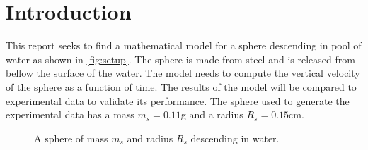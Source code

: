 \documentclass[10pt,a4paper, twocolumn]{article}
\title{\theTitle}
\author{\theAuthors}
\date{\today}
\begin{document}
	
	
	\maketitle
	\thispagestyle{empty}
	
	
	\begin{abstract}
		This report considers modelling the velocity of sphere falling through water. A simple model using Stokes' law is presented then compared to experimental data. The Reynolds number is then computed to show this problem falls outside the valid domain of Stokes' law. An improved model of drag is proposed using a drag coefficient. This model is also compared to the experimental data and gives good agreement with the terminal velocity reached. Possible further improvements such as the addition of a virtual weight and the inclusion a Basset force are discussed. 
		
	\end{abstract}
	
	
	\section{Introduction}
	\label{sec:intro}
	
	This report seeks to find a mathematical model for a sphere descending in pool of water as shown in \autoref{fig:setup}. The sphere is made from steel and is released from bellow the surface of the water. The model needs to compute the vertical velocity of the sphere as a function of time. The results of the model will be compared to experimental data to validate its performance. The sphere used to generate the experimental data has a mass $m_s=0.11$\si{g} and a radius $R_s=0.15$\si{cm}.
	
	\begin{figure}[!h]
		\centering
		\caption{A sphere of mass $m_s$ and radius $R_s$ descending in water.}
		\label{fig:setup}
	\end{figure}
\end{document}
